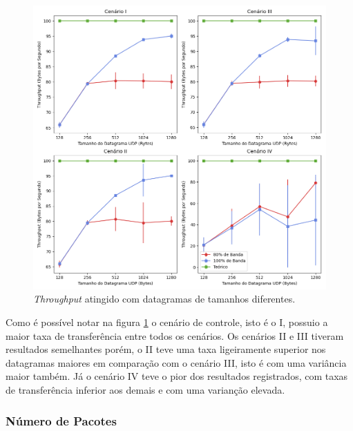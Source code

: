 \begin{figure}[!h]
    \centering
    \includegraphics[width=0.9\linewidth]{sources/fig-throughput.png}
		\caption{\textit{Throughput} atingido com datagramas de tamanhos diferentes.}
    \label{fig:throughput}
\end{figure}

Como é possível notar na figura \ref{fig:throughput} o cenário de controle, isto é o I, possuio a maior taxa de transferência entre todos os cenários. Os cenários II e III tiveram resultados semelhantes porém, o II teve uma taxa ligeiramente superior nos datagramas maiores em comparação com o cenário III, isto é com uma variância maior também. Já o cenário IV teve o pior dos resultados registrados, com taxas de transferência inferior aos demais e com uma varianção elevada.

\subsubsection{Número de Pacotes}

